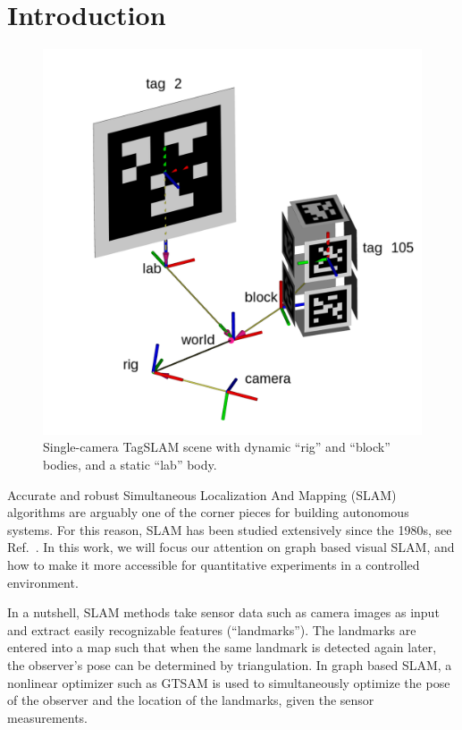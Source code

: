 \section{Introduction}
\begin{figure}[ht]
  \centering
  \includegraphics[width=\columnwidth]{scene_with_block.png}
  \caption{Single-camera TagSLAM scene with dynamic ``rig'' and ``block''
    bodies, and a static ``lab'' body.}
  \label{fig:scene_with_block}
\end{figure}

Accurate and robust Simultaneous Localization And Mapping (SLAM)
algorithms are arguably one of the corner pieces for building
autonomous systems. For this reason, SLAM has been studied extensively
since the 1980s, see Ref.\ \cite{cadena2016}. In this work, we will
focus our attention on graph based visual SLAM, and how to make it
more accessible for quantitative experiments in a controlled
environment.

In a nutshell, SLAM methods take sensor data such as camera images as
input and extract easily recognizable features (``landmarks''). The
landmarks are entered into a map such that when the same landmark is
detected again later, the observer's pose can be determined by
triangulation. In graph based SLAM, a nonlinear optimizer such as
GTSAM \cite{kaess2011} is used to simultaneously optimize the pose of
the observer and the location of the landmarks, given the sensor
measurements.

